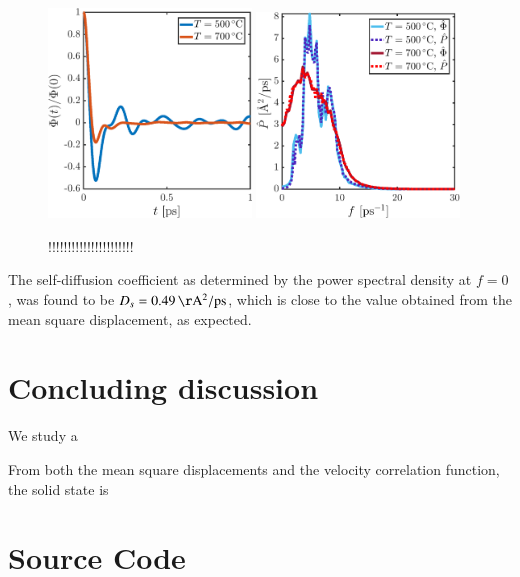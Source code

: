 \begin{figure}[!ht]
\begin{center}
  \includegraphics[width=0.48\textwidth]{../figures/Phi-t} 
    \includegraphics[width=0.48\textwidth]{../figures/P-freq} 
  \caption{!!!!!!!!!!!!!!!!!!!!!!}
  \label{fig:spectrum}
\end{center}
\end{figure}

The self-diffusion coefficient as determined by the power spectral density at $f=0$, was found to be  $D_s = \unit[0.49]{\AA^2/ps}$, which is close to the value obtained from the mean square displacement, as expected.  


\section*{Concluding discussion}

We study a 

From both the mean square displacements and the velocity correlation function, the solid state is 

\newpage

\appendix

\section{Source Code}

